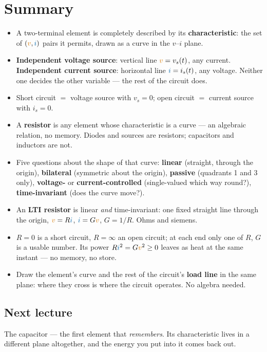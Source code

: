 \documentclass[11pt,a4paper]{article}
\newcommand{\Icol}[1]{\textcolor{ccur}{#1}}
\newcommand{\Vcol}[1]{\textcolor{cvolt}{#1}}
\begin{document}
\section*{Summary}

\begin{itemize}
  \item A two-terminal element is completely described by its \textbf{characteristic}: the
        set of $(\Vcol{v},\Icol{i})$ pairs it permits, drawn as a curve in the
        $v$--$i$ plane.
  \item \textbf{Independent voltage source}: vertical line $\Vcol{v} = v_s(t)$, any
        current. \textbf{Independent current source}: horizontal line $\Icol{i} = i_s(t)$,
        any voltage. Neither one decides the other variable --- the rest of the circuit
        does.
  \item Short circuit $=$ voltage source with $v_s = 0$; open circuit $=$ current source
        with $i_s = 0$.
  \item A \textbf{resistor} is any element whose characteristic is a curve --- an algebraic
        relation, no memory. Diodes and sources are resistors; capacitors and inductors
        are not.
  \item Five questions about the shape of that curve: \textbf{linear} (straight, through
        the origin), \textbf{bilateral} (symmetric about the origin), \textbf{passive}
        (quadrants 1 and 3 only), \textbf{voltage-} or \textbf{current-controlled}
        (single-valued which way round?), \textbf{time-invariant} (does the curve move?).
  \item An \textbf{LTI resistor} is linear \emph{and} time-invariant: one fixed straight
        line through the origin, $\Vcol{v} = R\Icol{i}$, $\Icol{i} = G\Vcol{v}$,
        $G = 1/R$. Ohms and siemens.
  \item $R = 0$ is a short circuit, $R = \infty$ an open circuit; at each end only one of
        $R$, $G$ is a usable number. Its power $R\Icol{i}^2 = G\Vcol{v}^2 \ge 0$ leaves as
        heat at the same instant --- no memory, no store.
  \item Draw the element's curve and the rest of the circuit's \textbf{load line} in the
        same plane: where they cross is where the circuit operates. No algebra needed.
\end{itemize}

\subsection*{Next lecture}
The capacitor --- the first element that \emph{remembers}. Its characteristic lives in a
different plane altogether, and the energy you put into it comes back out.
\end{document}
